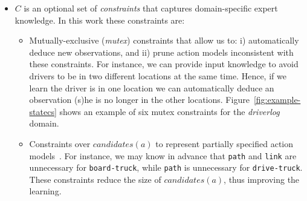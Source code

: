 \documentclass{ecai}
\begin{document}
\begin{itemize}
\item $C$ is an optional set of {\em constraints} that captures domain-specific expert knowledge. In this work these constraints are:

\begin{itemize}
\item Mutually-exclusive ({\em mutex}) constraints that allow us to: i) automatically deduce new observations, and ii) prune action models inconsistent with these constraints. For instance, we can provide input knowledge to avoid drivers to be in two different locations at the same time. Hence, if we learn the driver is in one location we can automatically deduce an observation (s)he is no longer in the other locations.
Figure~\ref{fig:example-statecs} shows an example of six mutex constraints for the {\em driverlog} domain. 


\item Constraints over $candidates(a)$ to represent partially specified action models~\cite{ZhuoNK13}. For instance, we may know in advance that \texttt{path} and \texttt{link} are unnecessary for {\tt board-truck}, while \texttt{path} is unnecessary for {\tt drive-truck}.
These constraints reduce the size of $candidates(a)$, thus improving the learning.
\end{itemize}
\end{itemize}
\end{document}

